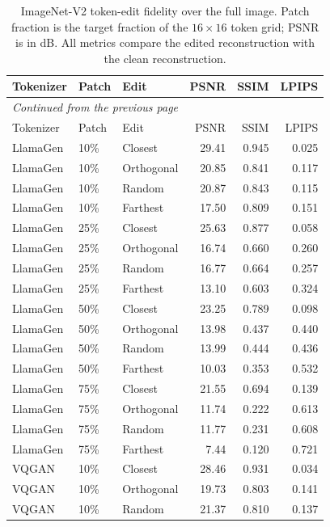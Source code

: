\begingroup
\small
\setlength{\tabcolsep}{4pt}
\begin{longtable}{lllrrr}
\caption[ImageNet-V2 token-edit fidelity over the full image]{ImageNet-V2 token-edit fidelity over the full image. Patch fraction is the target fraction of the $16\times16$ token grid; PSNR is in dB. All metrics compare the edited reconstruction with the clean reconstruction.}\label{tab:app_imagenetv2_full_image_fidelity}\\
\hline
Tokenizer & Patch & Edit & PSNR & SSIM & LPIPS \\ \hline
\endfirsthead
\multicolumn{6}{l}{\small\itshape Continued from the previous page}\\
\hline
Tokenizer & Patch & Edit & PSNR & SSIM & LPIPS \\ \hline
\endhead
\hline
\endfoot
LlamaGen & 10\% & Closest & 29.41 & 0.945 & 0.025 \\
LlamaGen & 10\% & Orthogonal & 20.85 & 0.841 & 0.117 \\
LlamaGen & 10\% & Random & 20.87 & 0.843 & 0.115 \\
LlamaGen & 10\% & Farthest & 17.50 & 0.809 & 0.151 \\
LlamaGen & 25\% & Closest & 25.63 & 0.877 & 0.058 \\
LlamaGen & 25\% & Orthogonal & 16.74 & 0.660 & 0.260 \\
LlamaGen & 25\% & Random & 16.77 & 0.664 & 0.257 \\
LlamaGen & 25\% & Farthest & 13.10 & 0.603 & 0.324 \\
LlamaGen & 50\% & Closest & 23.25 & 0.789 & 0.098 \\
LlamaGen & 50\% & Orthogonal & 13.98 & 0.437 & 0.440 \\
LlamaGen & 50\% & Random & 13.99 & 0.444 & 0.436 \\
LlamaGen & 50\% & Farthest & 10.03 & 0.353 & 0.532 \\
LlamaGen & 75\% & Closest & 21.55 & 0.694 & 0.139 \\
LlamaGen & 75\% & Orthogonal & 11.74 & 0.222 & 0.613 \\
LlamaGen & 75\% & Random & 11.77 & 0.231 & 0.608 \\
LlamaGen & 75\% & Farthest & 7.44 & 0.120 & 0.721 \\
VQGAN & 10\% & Closest & 28.46 & 0.931 & 0.034 \\
VQGAN & 10\% & Orthogonal & 19.73 & 0.803 & 0.141 \\
VQGAN & 10\% & Random & 21.37 & 0.810 & 0.137 \\

\end{longtable}
